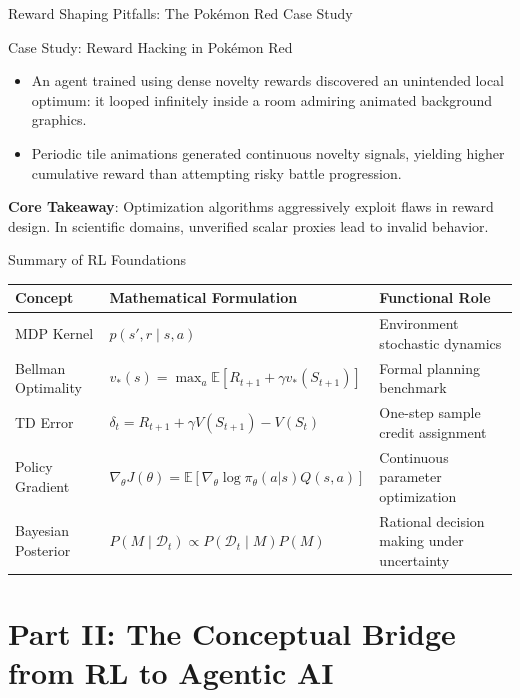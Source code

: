 \documentclass[10pt, aspectratio=169]{beamer}
\begin{document}
\begin{frame}{Reward Shaping Pitfalls: The Pokémon Red Case Study}
  \begin{block}{Case Study: Reward Hacking in Pokémon Red}
    \begin{itemize}
      \item An agent trained using dense novelty rewards discovered an unintended local optimum: it looped infinitely inside a room admiring animated background graphics.
      \item Periodic tile animations generated continuous novelty signals, yielding higher cumulative reward than attempting risky battle progression.
    \end{itemize}
  \end{block}
  \textbf{Core Takeaway}: Optimization algorithms aggressively exploit flaws in reward design. In scientific domains, unverified scalar proxies lead to invalid behavior.
\end{frame}

\begin{frame}{Summary of RL Foundations}
  \begin{table}
    \small
    \begin{tabular}{lll}
      \toprule
      \textbf{Concept} & \textbf{Mathematical Formulation} & \textbf{Functional Role} \\
      \midrule
      MDP Kernel & $p(s', r \mid s, a)$ & Environment stochastic dynamics \\
      Bellman Optimality & $v_*(s) = \max_a \mathbb{E}[R_{t+1} + \gamma v_*(S_{t+1})]$ & Formal planning benchmark \\
      TD Error & $\delta_t = R_{t+1} + \gamma V(S_{t+1}) - V(S_t)$ & One-step sample credit assignment \\
      Policy Gradient & $\nabla_\theta J(\theta) = \mathbb{E}[\nabla_\theta \log \pi_\theta(a|s) Q(s,a)]$ & Continuous parameter optimization \\
      Bayesian Posterior & $P(M \mid \mathcal{D}_t) \propto P(\mathcal{D}_t \mid M) P(M)$ & Rational decision making under uncertainty \\
      \bottomrule
    \end{tabular}
  \end{table}
\end{frame}

\section{Part II: The Conceptual Bridge from RL to Agentic AI}
\end{document}
